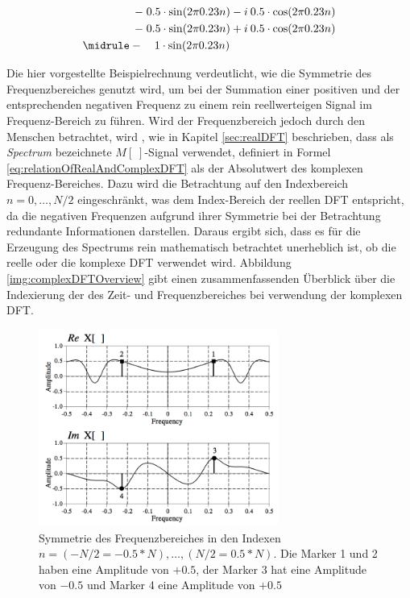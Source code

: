  \begin{equation}
 \begin{split}
-\; 0.5 \cdot \sin(2  \pi 0.23 n) - i \: 0.5 \cdot \cos(2  \pi 0.23 n) \\
-\; 0.5 \cdot \sin(2  \pi 0.23 n) + i \:  0.5 \cdot \cos(2  \pi 0.23 n) \\
\midrule
-\quad 1 \cdot  \sin (2  \pi 0.23 n) \qquad \qquad \qquad \qquad \quad \: \:
 \end{split}
 \label{eq:explainIDFTstep02}
 \end{equation}
 
Die hier vorgestellte Beispielrechnung verdeutlicht, wie die Symmetrie des Frequenzbereiches genutzt wird, um bei der Summation einer positiven und der entsprechenden negativen Frequenz zu einem rein reellwerteigen Signal im Frequenz-Bereich zu führen. Wird der Frequenzbereich jedoch durch den Menschen betrachtet, wird , wie in Kapitel \ref{sec:realDFT} beschrieben, dass als \emph{Spectrum} bezeichnete $M[\;]$-Signal verwendet, definiert in Formel \ref{eq:relationOfRealAndComplexDFT} als der Absolutwert des komplexen Frequenz-Bereiches. Dazu wird die Betrachtung auf den Indexbereich $n = 0 ,\ldots, N/2$ eingeschränkt, was dem Index-Bereich der reellen DFT entspricht, da die negativen Frequenzen aufgrund ihrer Symmetrie bei der Betrachtung redundante Informationen darstellen. Daraus ergibt sich, dass es für die Erzeugung des Spectrums rein mathematisch betrachtet unerheblich ist, ob die reelle oder die komplexe DFT verwendet wird. Abbildung \ref{img:complexDFTOverview} gibt einen zusammenfassenden Überblick über die Indexierung der des Zeit- und Frequenzbereiches bei verwendung der komplexen DFT. \cite[S. 225 - 226]{dspGuide}
 
 \begin{figure}[h]
 	\centering
 	\includegraphics[width=0.7\textwidth]{bilder/dftSymmetrie.png}
 	\caption{Symmetrie des Frequenzbereiches in den Indexen $n = (-N/2 = -0.5*N) ,\ldots ,  (N/2 = 0.5*N)$. Die Marker 1 und 2 haben eine Amplitude von $+0.5$, der Marker 3 hat eine Amplitude von $-0.5$ und Marker 4 eine Amplitude von $+0.5$ \cite[S. 572]{dspGuide}}
 	\label{img:symmetrieInDFT}
 \end{figure} 
 
